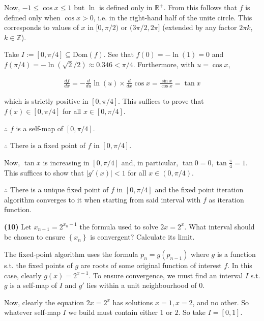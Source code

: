 \documentclass[12pt]{article}
\theoremstyle{definition}
\begin{document}
Now, $-1 \leq \cos x \leq 1$ but $\ln$ is defined only in $\mathbb{R}^+$. From
this follows that $f$ is defined only when $\cos x > 0$, i.e. in the right-hand
half of the unite circle. This corresponds to values of $x$ in $[0, \pi / 2)$ or 
$(3\pi / 2, 2\pi]$ (extended by any factor $2\pi k$, $k \in \mathbb{Z}$).

Take $I := [0, \pi /4] \subseteq \text{Dom}(f)$. See that $f(0) = -\ln(1) = 0$
and $f(\pi / 4) = -\ln(\sqrt{2} / 2 ) \approx 0.346 < \pi /4$. Furthermore, with
$u = \cos x$,

\begin{align*}
    \frac{df}{dx} = -\frac{d}{du} \ln(u) \times \frac{d}{dx} \cos x =
    \frac{\sin x}{\cos x} = \tan x
\end{align*}

which is strictly positive in $[0, \pi / 4]$. This suffices to prove that $f(x)
\in [0, \pi / 4]$ for all $x \in  [0, \pi / 4]$. 

$\therefore $ $f$ is a self-map of $[0, \pi / 4]$.

$\therefore $ There is a fixed point of $f$ in $[0, \pi / 4]$.

Now, $\tan x$ is increasing in $[0, \pi / 4]$ and, in particular, $\tan 0 = 0,
\tan \frac{\pi}{4} = 1$. This suffices to show that $|g'(x)| < 1$ for all $x \in
(0, \pi / 4)$. 

$\therefore $ There is a unique fixed point of $f$ in $[0, \pi / 4]$ and the
fixed point iteration algorithm converges to it when starting from said interval
with $f$ as iteration function.

\pagebreak 

\begin{shaded}
    \textbf{(10)} Let $x_{n+1} = 2^{x_n - 1}$ the formula used to solve $2x =
    2^x$. What interval should be chosen to ensure $\left\{ x_n \right\} $ is
    convergent? Calculate its limit.
\end{shaded}

The fixed-point algorithm uses the formula $p_n = g(p_{n-1})$ where $g$ is a
function s.t. the fixed points of $g$ are roots of some original function of
interest $f$. In this case, clearly $g(x) = 2^{x-1}$. To ensure convergence, we
must find an interval $I$ s.t. $g$ is a self-map of $I$ and $g'$ lies within a
unit neighbourhood of $0$.

Now, clearly the equation $2x = 2^x$ has solutions $x = 1, x = 2$, and no other.
So whatever self-map $I$ we build must contain either $1$ or $2$. So take $I =
[0, 1] $.
\end{document}
